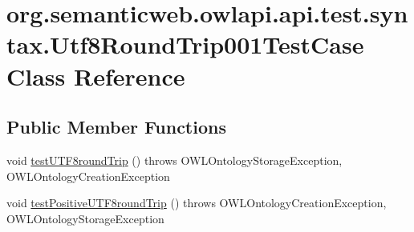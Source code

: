 \hypertarget{classorg_1_1semanticweb_1_1owlapi_1_1api_1_1test_1_1syntax_1_1_utf8_round_trip001_test_case}{\section{org.\-semanticweb.\-owlapi.\-api.\-test.\-syntax.\-Utf8\-Round\-Trip001\-Test\-Case Class Reference}
\label{classorg_1_1semanticweb_1_1owlapi_1_1api_1_1test_1_1syntax_1_1_utf8_round_trip001_test_case}
}
\subsection*{Public Member Functions}
\begin{DoxyCompactItemize}
\item 
void \hyperlink{classorg_1_1semanticweb_1_1owlapi_1_1api_1_1test_1_1syntax_1_1_utf8_round_trip001_test_case_ab213e61c76dc6c9193b4fc4ca31a066d}{test\-U\-T\-F8round\-Trip} ()  throws O\-W\-L\-Ontology\-Storage\-Exception,             O\-W\-L\-Ontology\-Creation\-Exception 
\item 
void \hyperlink{classorg_1_1semanticweb_1_1owlapi_1_1api_1_1test_1_1syntax_1_1_utf8_round_trip001_test_case_a145a682b7106390737c3278710d995cb}{test\-Positive\-U\-T\-F8round\-Trip} ()  throws O\-W\-L\-Ontology\-Creation\-Exception,             O\-W\-L\-Ontology\-Storage\-Exception 
\end{DoxyCompactItemize}


